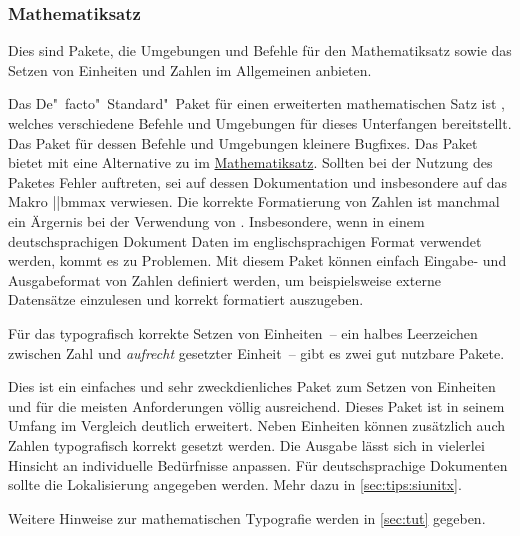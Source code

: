 \subsubsection{Mathematiksatz}
%
Dies sind Pakete, die Umgebungen und Befehle für den Mathematiksatz sowie das 
Setzen von Einheiten und Zahlen im Allgemeinen anbieten.

\begin{DeclarePackages}
  Das De"~facto"~Standard"~Paket für einen erweiterten mathematischen Satz ist 
  , welches verschiedene Befehle und Umgebungen für dieses 
  Unterfangen bereitstellt. Das Paket  für dessen Befehle 
  und Umgebungen kleinere Bugfixes.
  Das Paket bietet mit  eine Alternative zu  im 
  \href{http://tex.stackexchange.com/q/3238}{Mathematiksatz}. Sollten bei
  der Nutzung des Paketes Fehler auftreten, sei auf dessen Dokumentation und 
  insbesondere auf das Makro \Macro||{bmmax} verwiesen.
  Die korrekte Formatierung von Zahlen ist manchmal ein Ärgernis bei der  
  Verwendung von . Insbesondere, wenn in einem deutschsprachigen 
  Dokument Daten im englischsprachigen Format verwendet werden, kommt es zu 
  Problemen. Mit diesem Paket können einfach Eingabe- und Ausgabeformat von 
  Zahlen definiert werden, um beispielsweise externe Datensätze einzulesen und 
  korrekt formatiert auszugeben.
\end{DeclarePackages}
%
Für das typografisch korrekte Setzen von Einheiten~-- ein halbes Leerzeichen 
zwischen Zahl und \emph{aufrecht} gesetzter Einheit~-- gibt es zwei gut 
nutzbare Pakete.
%
\begin{DeclarePackages}
%
  Dies ist ein einfaches und sehr zweckdienliches Paket zum Setzen von 
  Einheiten und für die meisten Anforderungen völlig ausreichend.
  Dieses Paket ist in seinem Umfang im Vergleich deutlich erweitert. Neben 
  Einheiten können zusätzlich auch Zahlen typografisch korrekt gesetzt werden. 
  Die Ausgabe lässt sich in vielerlei Hinsicht an individuelle Bedürfnisse 
  anpassen. Für deutschsprachige Dokumenten sollte die Lokalisierung angegeben 
  werden. Mehr dazu in \autoref{sec:tips:siunitx}.
%
\end{DeclarePackages}
%
Weitere Hinweise zur mathematischen Typografie werden in \autoref{sec:tut} 
gegeben.%
%



